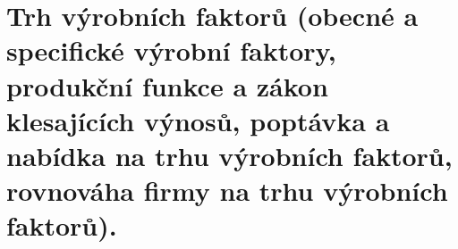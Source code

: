 \clearpage
\section{Trh výrobních faktorů (obecné a specifické výrobní faktory, produkční funkce a zákon
klesajících výnosů, poptávka a nabídka na trhu výrobních faktorů, rovnováha firmy na
trhu výrobních faktorů).}
